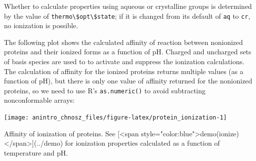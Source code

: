 \documentclass[]{tufte-book}
\begin{document}
\begin{marginfigure}
Whether to calculate properties using aqueous or crystalline groups is
determined by the value of
\texttt{thermo\textbackslash{}\$opt\textbackslash{}\$state}; if it is
changed from its default of \texttt{aq} to \texttt{cr}, no ionization is
possible.
\end{marginfigure}

The following plot shows the calculated affinity of reaction between
nonionized proteins and their ionized forms as a function of pH. Charged
and uncharged sets of basis species are used to to activate and suppress
the ionization calculations. The calculation of affinity for the ionized
proteins returns multiple values (as a function of pH), but there is
only one value of affinity returned for the nonionized proteins, so we
need to use R's \texttt{as.numeric()} to avoid subtracting
nonconformable arrays:

\begin{marginfigure}
\texttt{[image: anintro\_chnosz\_files/figure-latex/protein\_ionization-1]} \caption[Affinity of ionization of proteins]{Affinity of ionization of proteins. See [<span style="color:blue">demo(ionize)</span>](../demo) for ionization properties calculated as a function of temperature and pH.}\label{fig:protein_ionization}
\end{marginfigure}
\end{document}
